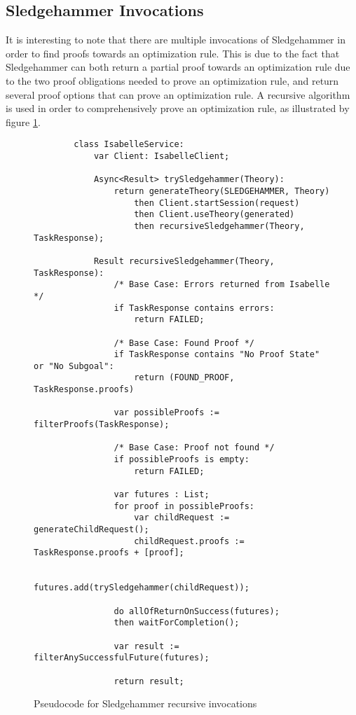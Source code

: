 \subsection{Sledgehammer Invocations}

It is interesting to note that there are multiple invocations of Sledgehammer in order to find proofs towards an optimization rule. This is due 
to the fact that Sledgehammer can both return a partial proof towards an optimization rule due to the two proof obligations needed to prove an 
optimization rule, and return several proof options that can prove an optimization rule. A recursive algorithm is used in order to comprehensively 
prove an optimization rule, as illustrated by figure \ref{fig:sledgehammerPseudocode}.

\begin{figure}[!htb]
    \begin{lstlisting}
        class IsabelleService:
            var Client: IsabelleClient;
            
            Async<Result> trySledgehammer(Theory):
                return generateTheory(SLEDGEHAMMER, Theory)
                    then Client.startSession(request)
                    then Client.useTheory(generated)
                    then recursiveSledgehammer(Theory, TaskResponse);
            
            Result recursiveSledgehammer(Theory, TaskResponse):
                /* Base Case: Errors returned from Isabelle */
                if TaskResponse contains errors:
                    return FAILED;
                
                /* Base Case: Found Proof */
                if TaskResponse contains "No Proof State" or "No Subgoal":
                    return (FOUND_PROOF, TaskResponse.proofs)
                
                var possibleProofs := filterProofs(TaskResponse);

                /* Base Case: Proof not found */
                if possibleProofs is empty:
                    return FAILED;
                
                var futures : List;
                for proof in possibleProofs:
                    var childRequest := generateChildRequest();
                    childRequest.proofs := TaskResponse.proofs + [proof];

                    futures.add(trySledgehammer(childRequest));
                
                do allOfReturnOnSuccess(futures);
                then waitForCompletion();

                var result := filterAnySuccessfulFuture(futures);

                return result;
    \end{lstlisting}

    \caption{Pseudocode for Sledgehammer recursive invocations}
    \label{fig:sledgehammerPseudocode}
\end{figure}

